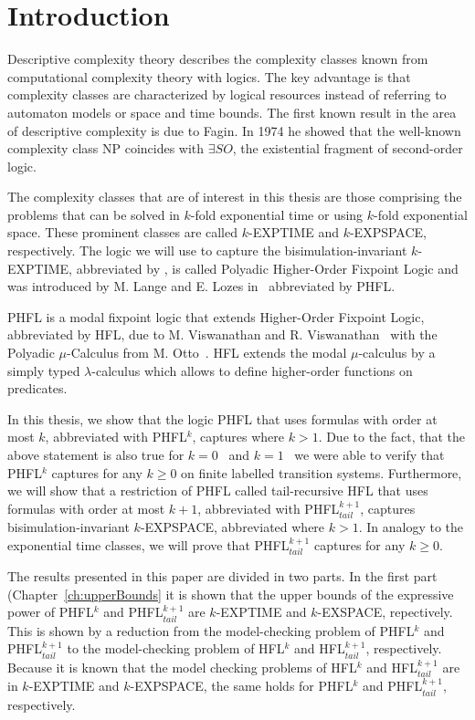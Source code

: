 \chapter{Introduction}\label{ch:introduction}

Descriptive complexity theory describes the complexity classes known from computational complexity theory with logics. The key advantage is that complexity classes are characterized by logical resources instead of referring to automaton models or space and time bounds. The first known result in the area of descriptive complexity is due to Fagin. In 1974 he showed that the well-known complexity class NP coincides with $\exists SO$, the existential fragment of second-order logic. 

The complexity classes that are of interest in this thesis are those comprising the problems that can be solved in $k$-fold exponential time or using $k$-fold exponential space. These prominent classes are called $k$-EXPTIME and $k$-EXPSPACE, respectively. The logic we will use to capture the bisimulation-invariant $k$-EXPTIME, abbreviated by , is called Polyadic Higher-Order Fixpoint Logic and was introduced by M. Lange and E. Lozes in~\cite{lange2014capturing} abbreviated by PHFL. 

PHFL is a modal fixpoint logic that extends Higher-Order Fixpoint Logic, abbreviated by HFL, due to M. Viswanathan and R. Viswanathan~\cite{viswanathan2004higher} with the Polyadic $\mu$-Calculus from M. Otto~\cite{otto1999bisimulation}. HFL extends the modal $\mu$-calculus by a simply typed $\lambda$-calculus which allows to define higher-order functions on predicates.

In this thesis, we show that the logic PHFL that uses formulas with order at most $k$, abbreviated with PHFL$^k$, captures  where $k > 1$. Due to the fact, that the above statement is also true for $k = 0$~\cite{otto1999bisimulation} and $k = 1$~\cite{lange2014capturing} we were able to verify that PHFL$^k$ captures  for any $k \geq 0$ on finite labelled transition systems. Furthermore, we will show that a restriction of PHFL called tail-recursive HFL that uses formulas with order at most $k+1$, abbreviated with PHFL$^{k+1}_{tail}$, captures bisimulation-invariant $k$-EXPSPACE, abbreviated  where $k > 1$. In analogy to the exponential time classes, we will prove that PHFL$^{k+1}_{tail}$ captures  for any $k \geq 0$. 

The results presented in this paper are divided in two parts. In the first part (Chapter~\ref{ch:upperBounds} it is shown that the upper bounds of the expressive power of PHFL$^k$ and PHFL$^{k+1}_{tail}$ are $k$-EXPTIME and $k$-EXSPACE, repectively. This is shown by a reduction from the model-checking problem of PHFL$^k$ and PHFL$^{k+1}_{tail}$ to the model-checking problem of HFL$^k$ and HFL$^{k+1}_{tail}$, respectively. Because it is known that the model checking problems of HFL$^k$ and HFL$^{k+1}_{tail}$ are in $k$-EXPTIME and $k$-EXPSPACE, the same holds for PHFL$^k$ and PHFL$^{k+1}_{tail}$, respectively.

